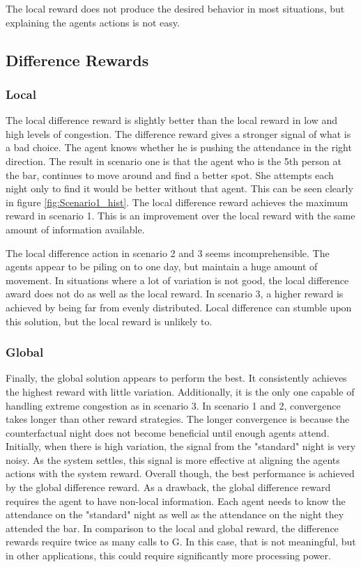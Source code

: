 \documentclass[letterpaper, 10 pt, conference]{ieeeconf}
\begin{document}
The local reward does not produce the desired behavior in most situations, but explaining the agents actions is not easy.

\subsection{Difference Rewards}
\subsubsection{Local}
The local difference reward is slightly better than the local reward in low and high levels of congestion.  The difference reward gives a stronger signal of what is a bad choice.  The agent knows whether he is pushing the attendance in the right direction.  The result in scenario one is that the agent who is the 5th person at the bar, continues to move around and find a better spot.  She attempts each night only to find it would be better without that agent.  This can be seen clearly in figure \ref{fig:Scenario1_hist}.  The local difference reward achieves the maximum reward in scenario 1.  This is an improvement over the local reward with the same amount of information available.

The local difference action in scenario 2 and 3 seems incomprehensible.  The agents appear to be piling on to one day, but maintain a huge amount of movement.  In situations where a lot of variation is not good, the local difference award does not do as well as the local reward.  In scenario 3, a higher reward is achieved by being far from evenly distributed.  Local difference can stumble upon this solution, but the local reward is unlikely to.


\subsubsection{Global}
Finally, the global solution appears to perform the best.  It consistently achieves the highest reward with little variation.  Additionally, it is the only one capable of handling extreme congestion as in scenario 3.  In scenario 1 and 2, convergence takes longer than other reward strategies.  The longer convergence is because the counterfactual night does not become beneficial until enough agents attend.  Initially, when there is high variation, the signal from the "standard" night is very noisy.  As the system settles, this signal is more effective at aligning the agents actions with the system reward.  Overall though, the best performance is achieved by the global difference reward.  As a drawback, the global difference reward requires the agent to have non-local information.  Each agent needs to know the attendance on the "standard" night as well as the attendance on the night they attended the bar.  In comparison to the local and global reward, the difference rewards require twice as many calls to G.  In this case, that is not meaningful, but in other applications, this could require significantly more processing power.
\end{document}
